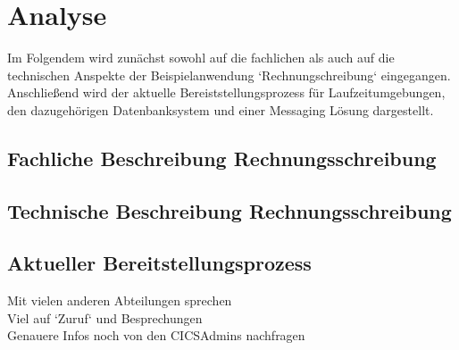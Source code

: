 \chapter{Analyse}\label{ch:analyse}
Im Folgendem wird zunächst sowohl auf die fachlichen als auch auf die technischen Anspekte der Beispielanwendung `Rechnungschreibung` eingegangen.
Anschließend wird der aktuelle Bereiststellungsprozess für Laufzeitumgebungen, den dazugehörigen Datenbanksystem und einer Messaging Lösung dargestellt.

\section{Fachliche Beschreibung Rechnungsschreibung}


\section{Technische Beschreibung Rechnungsschreibung}


\section{Aktueller Bereitstellungsprozess}
Mit vielen anderen Abteilungen sprechen\\
Viel auf `Zuruf` und Besprechungen\\
Genauere Infos noch von den CICSAdmins nachfragen\\

 